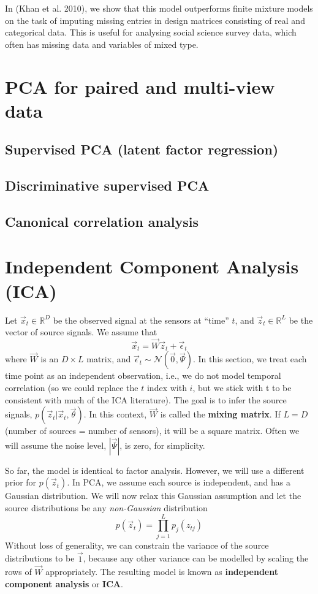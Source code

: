 In (Khan et al. 2010), we show that this model outperforms finite mixture models on the task of imputing missing entries in design matrices consisting of real and categorical data. This is useful for analysing social science survey data, which often has missing data and variables of mixed type.


\section{PCA for paired and multi-view data}


\subsection{Supervised PCA (latent factor regression)}


\subsection{Discriminative supervised PCA}


\subsection{Canonical correlation analysis}


\section{Independent Component Analysis (ICA)}
\label{sec:ICA}
Let $\vec{x}_t \in \mathbb{R}^D$ be the observed signal at the sensors at “time” $t$, and $\vec{z}_t \in \mathbb{R}^L$ be the vector of source signals. We assume that
\begin{equation}
\vec{x}_t=\vec{W}\vec{z}_t+\vec{\epsilon}_t
\end{equation}
where $\vec{W}$ is an $D \times L$ matrix, and $\vec{\epsilon}_t \sim \mathcal{N}(\vec{0},\vec{\Psi})$. In this section, we treat each time point as an independent observation, i.e., we do not model temporal correlation (so we could replace the $t$ index with $i$, but we stick with t to be consistent with much of the ICA literature). The goal is to infer the source signals, $p(\vec{z}_t|\vec{x}_t,\vec{\theta})$. In this context, $\vec{W}$ is called the \textbf{mixing matrix}. If $L=D$ (number of sources = number of sensors), it will be a square matrix. Often we will assume the noise level, $|\vec{\Psi}|$, is zero, for simplicity.

So far, the model is identical to factor analysis. However, we will use a different prior for $p(\vec{z}_t)$. In PCA, we assume each source is independent, and has a Gaussian distribution. We will now relax this Gaussian assumption and let the source distributions be any \emph{non-Gaussian} distribution
\begin{equation}
p(\vec{z}_t) =\prod\limits_{j=1}^L p_j(z_{tj})
\end{equation}
Without loss of generality, we can constrain the variance of the source distributions to be $\vec{1}$, because any other variance can be modelled by scaling the rows of $\vec{W}$ appropriately. The resulting model is known as \textbf{independent component analysis} or \textbf{ICA}.

